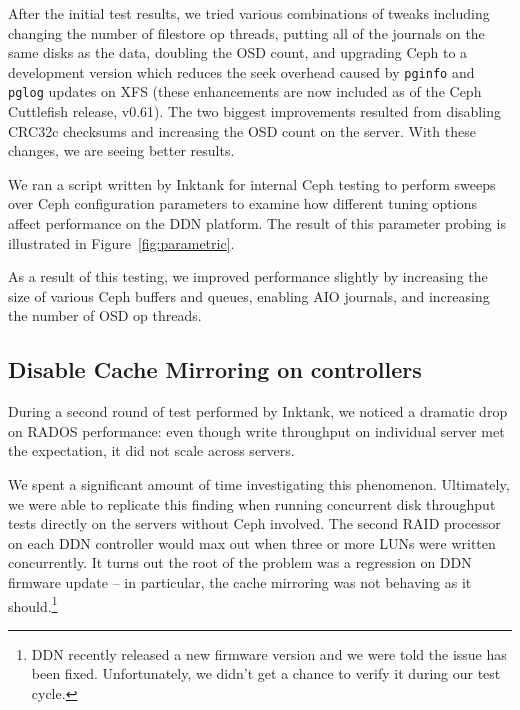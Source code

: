 \documentclass{article}
\begin{document}
After the initial test results, we tried various combinations of tweaks
including changing the number of filestore op threads, putting all of the
journals on the same disks as the data, doubling the OSD count, and upgrading
Ceph to a development version which reduces the seek overhead caused by
\texttt{pginfo} and \texttt{pglog} updates on XFS (these enhancements are now
included as of the Ceph Cuttlefish release, v0.61).  The two biggest
improvements resulted from disabling CRC32c checksums and increasing the OSD
count on the server.  With these changes, we are seeing better results.

We ran a script written by Inktank for internal Ceph testing to perform
sweeps over Ceph configuration parameters to examine how different
tuning options affect performance on the DDN platform. The result of this
parameter probing is illustrated in Figure~\ref{fig:parametric}.

As a result of this testing, we improved performance slightly by
increasing the size of various Ceph buffers and queues, enabling AIO journals,
and increasing the number of OSD op threads.


\subsection{Disable Cache Mirroring on controllers}

During a second round of test performed by Inktank, we noticed a dramatic drop
on RADOS performance: even though write throughput on individual server met the
expectation, it did not scale across servers.

We spent a significant amount of time
investigating this phenomenon. Ultimately, we were able to replicate this finding
when running concurrent disk throughput tests directly on the servers without
Ceph involved. The second RAID processor on each DDN controller would max out when
three or more LUNs were written concurrently. It turns out the root of the problem
was a regression on DDN firmware update -- in particular, the cache
mirroring was not behaving as it should.\footnote{DDN recently released a new
firmware version and we were told the issue has been fixed. Unfortunately, we didn't get
a chance to verify it during our test cycle.}

\end{document}
